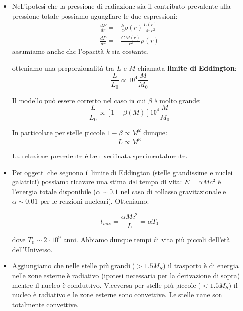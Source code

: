 \documentclass[11pt,a4paper]{article}
\begin{document}
\begin{itemize}
\item Nell'ipotesi che la pressione di radiazione sia il contributo prevalente alla pressione totale possiamo uguagliare le due espressioni:
\begin{gather}
\frac{d P}{d r} = -\frac{k}{c} \rho (r)  \frac{L(r)}{4 \pi r^2} \\
\frac{dP}{dr} = -\frac{G M(r)}{r^2} \rho (r)
\end{gather}
assumiamo anche che l'opacità $k$ sia costante.

otteniamo una proporzionalità tra $L$ e $M$ chiamata \textbf{limite di Eddington}:
\begin{equation}
\frac{L}{L_0} \propto 10^{4} \frac{M}{M_0}
\end{equation}

Il modello può essere corretto nel caso in cui $\beta$ è molto grande:
\begin{equation}
\frac{L}{L_0} \propto \left[ 1 - \beta (M) \right] 10^{4} \frac{M}{M_0}
\end{equation}

In particolare per stelle piccole $	1 - \beta \propto M^2$ dunque:
\begin{equation}
L \propto M^3
\end{equation} 

La relazione precedente è ben verificata sperimentalmente.

\item Per oggetti che seguono il limite di Eddington (stelle grandissime e nuclei galattici) possiamo ricavare una stima del tempo di vita: $E = \alpha M c^2$ è l'energia totale disponibile ($\alpha \sim 0.1$ nel caso di collasso gravitazionale e $\alpha \sim 0.01$ per le reazioni nucleari). Otteniamo:

\begin{equation}
t_{vita} = \frac{\alpha M c^2}{L} = \alpha T_0
\end{equation} 

dove $T_0 \sim 2 \cdot 10^9$ anni. Abbiamo dunque tempi di vita più piccoli dell'età dell'Universo.

\item Aggiungiamo che nelle stelle più grandi ($> 1.5 M_S$) il trasporto è di energia nelle zone esterne è radiativo (ipotesi necessaria per la derivazione di sopra) mentre il nucleo è conduttivo. Viceversa per stelle più piccole ($< 1.5 M_S$) il nucleo è radiativo e le zone esterne sono convettive. Le stelle nane son totalmente convettive.
\end{itemize}
\end{document}

